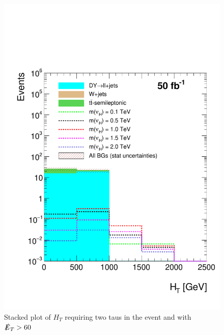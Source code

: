 \begin{figure}[H]
\centering
\includegraphics[width=\linewidth]{StackPlots/HT_2Taus_met60_50ifb_2moreSignals.pdf}
\caption{Stacked plot of $H_{T}$ requiring two taus in the event and with $\slashed{E}_{T} > 60$}
\label{fig: HT2tausMet60}
\end{figure}



